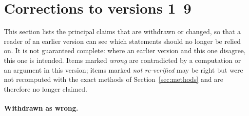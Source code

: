 \section{Corrections to versions 1--9}\label{sec:corrections}

This section lists the principal claims that are withdrawn or changed, so that a reader of an
earlier version can see which statements should no longer be relied on.  It is not guaranteed
complete: where an earlier version and this one disagree, this one is intended.  Items marked \emph{wrong} are
contradicted by a computation or an argument in this version; items marked \emph{not
re-verified} may be right but were not recomputed with the exact methods of
Section~\ref{sec:methods} and are therefore no longer claimed.

\paragraph{Withdrawn as wrong.}
